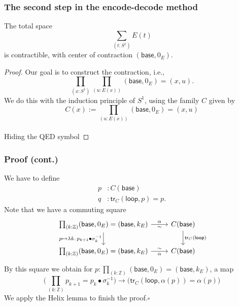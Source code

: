 \documentclass[handout]{beamer}
\newcommand{\Z}{\mathbb{Z}}
\newcommand{\sphere}[1]{S^{#1}}
\newcommand{\baseS}{\mathsf{base}}
\newcommand{\loopS}{\mathsf{loop}}
\newcommand{\tr}{\mathsf{tr}}
\begin{document}
\begin{frame}
  \frametitle{The second step in the encode-decode method}
  \begin{theorem}
    The total space
    \begin{equation*}
      \sum_{(t:\sphere{1})}E(t)
    \end{equation*}
    is contractible, with center of contraction $(\baseS,0_E)$.
  \end{theorem}

  \begin{proof}
    Our goal is to construct the contraction, i.e.,
    \begin{equation*}
      \prod_{(x:\sphere{1})}\prod_{(u:E(x))}(\baseS,0_E)=(x,u).
    \end{equation*}
    We do this with the induction principle of $\sphere{1}$, using the family $C$ given by
    \begin{equation*}
      C(x):=\prod_{(u:E(x))}(\baseS,0_E)=(x,u)
    \end{equation*}
    \\[10cm]
    Hiding the QED symbol
  \end{proof}
\end{frame}

\begin{frame}
  \frametitle{Proof (cont.)}
  We have to define
  \begin{align*}
    p & : C(\baseS) \\
    q & : \tr_C(\loopS,p)=p.
  \end{align*}
  Note that we have a commuting square
  \begin{equation*}
    \begin{tikzcd}[ampersand replacement=\&]
      \prod_{(k:\Z)}(\baseS,0_E)=(\baseS,k_E) \arrow[r,"\alpha","\sim"'] \arrow[d,swap,"{p\mapsto \lambda k.\,p_{k+1}\bullet\sigma_k^{-1}}"] \& C(\baseS) \arrow[d,"\tr_C(\loopS)"] \\
      \prod_{(k:\Z)}(\baseS,0_E)=(\baseS,k_E) \arrow[r,swap,"\alpha","\sim"'] \& C(\baseS)
    \end{tikzcd}
  \end{equation*}
  By this square we obtain for $p:\prod_{(k:\Z)}(\baseS,0_E)=(\baseS,k_E)$, a map
  \begin{equation*}
    \Big(\prod_{(k:\Z)}p_{k+1}=p_k\bullet \sigma_k^{-1}\Big)\to \Big(\tr_C(\loopS,\alpha(p))=\alpha(p)\Big)
  \end{equation*}
  We apply the Helix lemma to finish the proof.\hfill $\square$
\end{frame}
\end{document}
